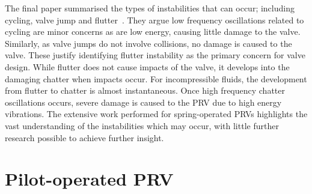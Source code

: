 The final paper summarised the types of instabilities that can occur; including cycling, valve jump and flutter~\cite{Hos2017DynamicRecommendations}.
They argue low frequency oscillations related to cycling are minor concerns as are low energy, causing little damage to the valve. Similarly, as valve jumps do not involve collisions, no damage is caused to the valve.
%
These justify identifying flutter instability as the primary concern for valve design. While flutter does not cause impacts of the valve, it develops into the damaging chatter when impacts occur. For incompressible fluids, the development from flutter to chatter is almost instantaneous. Once high frequency chatter oscillations occurs, severe damage is caused to the PRV due to high energy vibrations. %
The extensive work performed for spring-operated PRVs highlights the vast understanding of the  instabilities which may occur, with little further research possible to achieve further insight.

\vspace{-10pt}
\section{Pilot-operated PRV}


